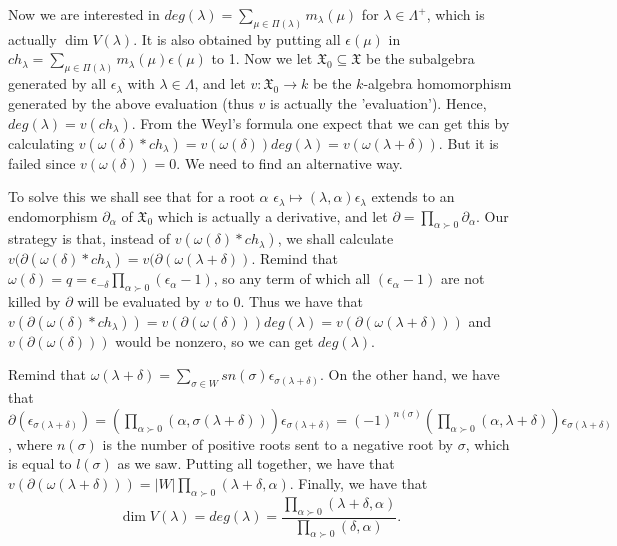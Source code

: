 \documentclass{article}
\begin{document}
Now we are interested in $deg(\lambda) = \sum_{\mu \in \Pi(\lambda)} m_\lambda(\mu)$ for $\lambda \in \Lambda^+$, which is actually $\dim{V(\lambda)}$.
It is also obtained by putting all $\epsilon(\mu)$ in $ch_\lambda = \sum_{\mu \in \Pi(\lambda)} m_\lambda(\mu) \epsilon(\mu)$ to 1.
Now we let $\mathfrak{X}_0 \subseteq \mathfrak{X}$ be the subalgebra generated by all $\epsilon_\lambda$ with $\lambda \in \Lambda$, and let $v : \mathfrak{X}_0 \to k$ be the $k$-algebra homomorphism generated by the above evaluation (thus $v$ is actually the 'evaluation').
Hence, $deg(\lambda) = v(ch_\lambda)$.
From the Weyl's formula one expect that we can get this by calculating $v(\omega(\delta) * ch_\lambda) = v(\omega(\delta)) deg(\lambda) = v(\omega(\lambda + \delta))$.
But it is failed since $v(\omega(\delta)) = 0$.
We need to find an alternative way.

To solve this we shall see that for a root $\alpha$ $\epsilon_\lambda \mapsto (\lambda, \alpha) \epsilon_\lambda$ extends to an endomorphism $\partial_\alpha$ of $\mathfrak{X}_0$ which is actually a derivative, and let $\partial = \prod_{\alpha \succ 0} \partial_\alpha$.
Our strategy is that, instead of $v(\omega(\delta) * ch_\lambda)$, we shall calculate $v(\partial(\omega(\delta) * ch_\lambda) = v(\partial(\omega(\lambda + \delta))$.
Remind that $\omega(\delta) = q = \epsilon_{-\delta} \prod_{\alpha \succ 0} (\epsilon_\alpha - 1)$, so any term of which all $(\epsilon_\alpha - 1)$ are not killed by $\partial$ will be evaluated by $v$ to 0.
Thus we have that $v(\partial(\omega(\delta) * ch_\lambda)) = v(\partial(\omega(\delta))) deg(\lambda) = v(\partial(\omega(\lambda + \delta)))$ and $v(\partial(\omega(\delta)))$ would be nonzero, so we can get $deg(\lambda)$.

Remind that $\omega(\lambda + \delta) = \sum_{\sigma \in W} sn(\sigma) \epsilon_{\sigma(\lambda + \delta)}$.
On the other hand, we have that $\partial(\epsilon_{\sigma(\lambda + \delta)}) = (\prod_{\alpha \succ 0} (\alpha, \sigma(\lambda + \delta))) \epsilon_{\sigma(\lambda + \delta)} = (-1)^{n(\sigma)} (\prod_{\alpha \succ 0} (\alpha, \lambda + \delta)) \epsilon_{\sigma(\lambda + \delta)}$, where $n(\sigma)$ is the number of positive roots sent to a negative root by $\sigma$, which is equal to $l(\sigma)$ as we saw.
Putting all together, we have that $v(\partial(\omega(\lambda + \delta))) = |W| \prod_{\alpha \succ 0} (\lambda + \delta, \alpha)$.
Finally, we have that
\begin{displaymath}
  \dim{V(\lambda)} = deg(\lambda) = \frac{\prod_{\alpha \succ 0} (\lambda + \delta, \alpha)}{\prod_{\alpha \succ 0} (\delta, \alpha)}.
\end{displaymath}
\end{document}
